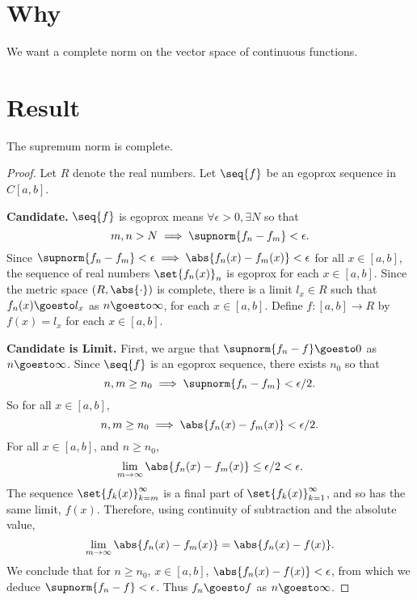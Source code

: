 
\section*{Why}

We want a complete norm on the vector space of continuous functions.

\section*{Result}

\begin{proposition}
The supremum norm is complete.
\end{proposition}

\begin{proof}Let $R$ denote the real numbers.
Let $\seq{f}$ be an egoprox sequence
in $C[a, b]$.

\textbf{Candidate.} $\seq{f}$ is egoprox means $\forall \epsilon > 0, \exists N$ so that
\[
m, n > N \implies \supnorm{f_n - f_m} < \epsilon .
\]
Since $\supnorm{f_n - f_m} < \epsilon  \implies \abs{f_n(x) - f_m(x)} < \epsilon $ for all $x \in [a, b]$, the sequence of real numbers $\set{f_n(x)}_n$ is egoprox for each $x \in [a, b]$.
Since the metric space $(R, \abs{\cdot })$ is complete, there is a limit $l_x \in R$ such that $f_n(x) \goesto l_x$ as $n \goesto \infty$, for each $x \in [a, b]$.
Define $f: [a, b] \to R$ by $f(x) = l_x$ for each $x \in [a, b]$.

\textbf{Candidate is Limit.}
First, we argue that
$\supnorm{f_n - f} \goesto 0$
as $n \goesto \infty$.
Since $\seq{f}$ is an egoprox sequence, there exists $n_0$ so that
\[
n,m \geq n_0
\implies
\supnorm{f_n - f_m} < \epsilon /2.
\]
So for all $x \in [a, b]$,
\[
n,m \geq n_0
\implies
\abs{f_n(x) - f_m(x)} < \epsilon /2.
\]
For all $x \in [a, b]$, and $n \geq n_0$,
\[
\lim_{m \to \infty} \abs{f_n(x) - f_m(x)}
\leq \epsilon /2 < \epsilon .
\]
The sequence
$\set{f_k(x)}_{k = m}^{\infty}$
is a final part of
$\set{f_k(x)}_{k = 1}^{\infty}$,
and so has the same limit, $f(x)$.
Therefore, using continuity
of subtraction and the absolute
value,
\[
\lim_{m \to \infty}
\abs{f_n(x) - f_m(x)}
=
\abs{f_n(x) - f(x)}.
\]
We conclude that for
$n \geq n_0$,
$x \in [a, b]$,
$\abs{f_n(x) - f(x)} < \epsilon $,
from which we deduce
$\supnorm{f_n - f} < \epsilon $.
Thus $f_n \goesto f$
as $n \goesto \infty$.


\end{proof}
